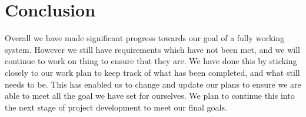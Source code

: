 \section{Conclusion}
	Overall we have made significant progress towards our goal of a fully working system. However we still have requirements which have not been met, and we will continue to work on thing to ensure that they are. 
	We have done this by sticking closely to our work plan to keep track of what has been completed, and what still needs to be. This has enabled us to change and update our plans to ensure we are able to meet all the goal we have set for ourselves.
	We plan to continue this into the next stage of project development to meet our final goals.

